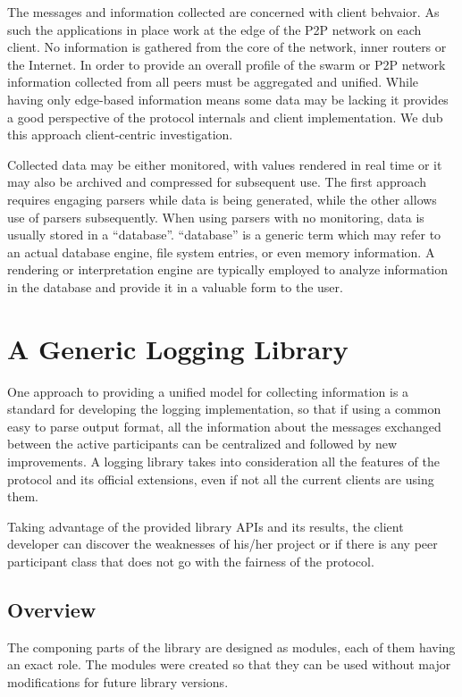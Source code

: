 The messages and information collected are concerned with client behvaior. As
such the applications in place work at the edge of the P2P network on each
client. No information is gathered from the core of the network, inner routers
or the Internet. In order to provide an overall profile of the swarm or P2P
network information collected from all peers must be aggregated and unified.
While having only edge-based information means some data may be lacking it
provides a good perspective of the protocol internals and client
implementation. We dub this approach client-centric investigation.

Collected data may be either monitored, with values rendered in real time or
it may also be archived and compressed for subsequent use. The first approach
requires engaging parsers while data is being generated, while the other
allows use of parsers subsequently. When using parsers with no monitoring,
data is usually stored in a ``database''. ``database'' is a generic term which
may refer to an actual database engine, file system entries, or even memory
information. A rendering or interpretation engine are typically employed to
analyze information in the database and provide it in a valuable form to the
user.

\section{A Generic Logging Library}
\label{sec:proto-measure:log-library}

One approach to providing a unified model for collecting information is a
standard for developing the logging implementation, so that if using a common
easy to parse output format, all the information about the messages exchanged
between the active participants can be centralized and followed by new
improvements. A logging library takes into consideration all the features of
the protocol and its official extensions, even if not all the current clients
are using them.

Taking advantage of the provided library APIs and its results, the client
developer can discover the weaknesses of his/her project or if there is any
peer participant class that does not go with the fairness of the protocol.

\subsection{Overview}

The componing parts of the library are designed as modules, each of them
having an exact role. The modules were created so that they can be used
without major modifications for future library versions.

